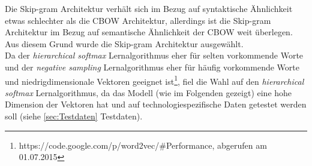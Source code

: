 \documentclass[12pt,a4paper]{report}
\begin{document}
Die Skip-gram Architektur verhält sich im Bezug auf syntaktische Ähnlichkeit etwas schlechter als die CBOW Architektur, allerdings ist die Skip-gram Architektur im Bezug auf semantische Ähnlichkeit der CBOW weit überlegen\citep{DBLP:journals/corr/abs-1301-3781}.\\ Aus diesem Grund wurde die Skip-gram Architektur ausgewählt.\\
Da der \textit{hierarchical softmax} Lernalgorithmus eher für selten vorkommende Worte und der \textit{negative sampling} Lernalgorithmus eher für häufig vorkommende Worte und niedrigdimensionale Vektoren geeignet ist\footnote{https://code.google.com/p/word2vec/\#Performance, abgerufen am 01.07.2015}, fiel die Wahl auf den \textit{hierarchical softmax} Lernalgorithmus, da das Modell (wie im Folgenden gezeigt) eine hohe Dimension der Vektoren hat und auf technologiespezifische Daten getestet werden soll (siehe \ref{sec:Testdaten} Testdaten).\\
\end{document}
